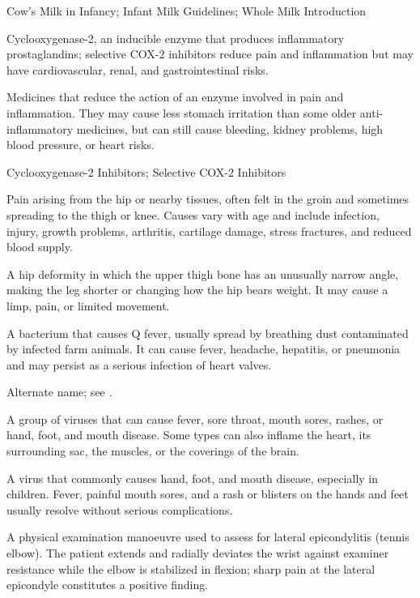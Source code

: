 \synonyms
Cow's Milk in Infancy; Infant Milk Guidelines; Whole Milk Introduction

 Cyclooxygenase-2, an inducible enzyme that produces inflammatory prostaglandins; selective COX-2 inhibitors reduce pain and inflammation but may have cardiovascular, renal, and gastrointestinal risks.

 Medicines that reduce the action of an enzyme involved in pain and inflammation. They may cause less stomach irritation than some older anti-inflammatory medicines, but can still cause bleeding, kidney problems, high blood pressure, or heart risks.

\synonyms
Cyclooxygenase-2 Inhibitors; Selective COX-2 Inhibitors

 Pain arising from the hip or nearby tissues, often felt in the groin and sometimes spreading to the thigh or knee. Causes vary with age and include infection, injury, growth problems, arthritis, cartilage damage, stress fractures, and reduced blood supply.

 A hip deformity in which the upper thigh bone has an unusually narrow angle, making the leg shorter or changing how the hip bears weight. It may cause a limp, pain, or limited movement.

 A bacterium that causes Q fever, usually spread by breathing dust contaminated by infected farm animals. It can cause fever, headache, hepatitis, or pneumonia and may persist as a serious infection of heart valves.

 Alternate name; see .

 A group of viruses that can cause fever, sore throat, mouth sores, rashes, or hand, foot, and mouth disease. Some types can also inflame the heart, its surrounding sac, the muscles, or the coverings of the brain.

 A virus that commonly causes hand, foot, and mouth disease, especially in children. Fever, painful mouth sores, and a rash or blisters on the hands and feet usually resolve without serious complications.

 A physical examination manoeuvre used to assess for lateral epicondylitis (tennis elbow). The patient extends and radially deviates the wrist against examiner resistance while the elbow is stabilized in flexion; sharp pain at the lateral epicondyle constitutes a positive finding.

